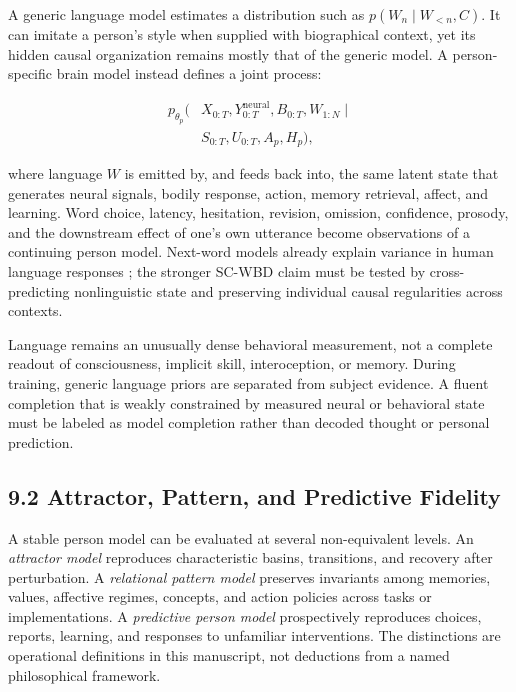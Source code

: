 A generic language model estimates a distribution such as
\(p(W_n\mid W_{<n},C)\). It can imitate a person's style when supplied with
biographical context, yet its hidden causal organization remains mostly that
of the generic model. A person-specific brain model instead defines a joint
process:

\[
\begin{aligned}
p_{\theta_p}\bigl(&X_{0:T},Y_{0:T}^{\mathrm{neural}},
B_{0:T},W_{1:N}\mid\\
&S_{0:T},U_{0:T},A_p,H_p\bigr),
\end{aligned}
\]

where language \(W\) is emitted by, and feeds back into, the same latent state
that generates neural signals, bodily response, action, memory retrieval,
affect, and learning. Word choice, latency, hesitation, revision, omission,
confidence, prosody, and the downstream effect of one's own utterance become
observations of a continuing person model. Next-word models already explain
variance in human language responses \citep{goldstein2022,schrimpf2021}; the
stronger SC-WBD claim must be tested by cross-predicting nonlinguistic state
and preserving individual causal regularities across contexts.

Language remains an unusually dense behavioral measurement, not a complete
readout of consciousness, implicit skill, interoception, or memory. During
training, generic language priors are separated from subject evidence. A
fluent completion that is weakly constrained by measured neural or behavioral
state must be labeled as model completion rather than decoded thought or
personal prediction.

\subsection{9.2 Attractor, Pattern, and Predictive Fidelity}

A stable person model can be evaluated at several non-equivalent levels. An
\emph{attractor model} reproduces characteristic basins, transitions, and
recovery after perturbation. A \emph{relational pattern model} preserves
invariants among memories, values, affective regimes, concepts, and action
policies across tasks or implementations. A \emph{predictive person model}
prospectively reproduces choices, reports, learning, and responses to
unfamiliar interventions. The distinctions are operational definitions in
this manuscript, not deductions from a named philosophical framework.

